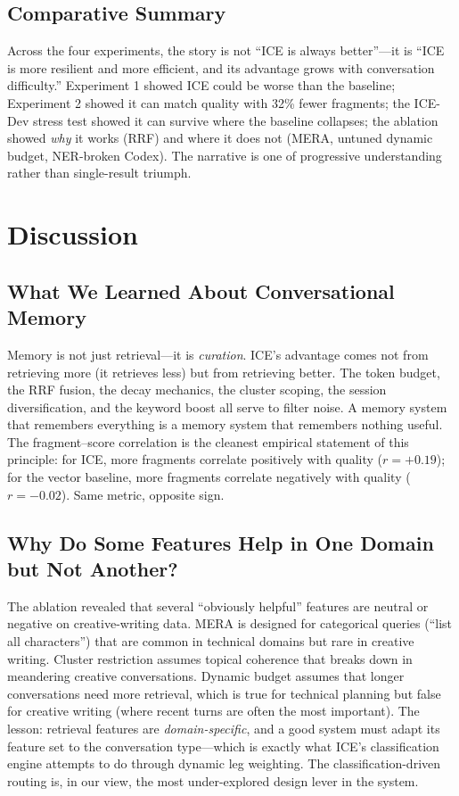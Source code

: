 \documentclass[11pt,a4paper]{article}
\begin{document}
\subsection{Comparative Summary}

Across the four experiments, the story is not ``ICE is always better''---it is ``ICE is more resilient and more efficient, and its advantage grows with conversation difficulty.'' Experiment 1 showed ICE could be worse than the baseline; Experiment 2 showed it can match quality with 32\% fewer fragments; the ICE-Dev stress test showed it can survive where the baseline collapses; the ablation showed \emph{why} it works (RRF) and where it does not (MERA, untuned dynamic budget, NER-broken Codex). The narrative is one of progressive understanding rather than single-result triumph.

\section{Discussion}
\label{sec:discussion}

\subsection{What We Learned About Conversational Memory}

Memory is not just retrieval---it is \emph{curation}. ICE's advantage comes not from retrieving more (it retrieves less) but from retrieving better. The token budget, the RRF fusion, the decay mechanics, the cluster scoping, the session diversification, and the keyword boost all serve to filter noise. A memory system that remembers everything is a memory system that remembers nothing useful. The fragment--score correlation is the cleanest empirical statement of this principle: for ICE, more fragments correlate positively with quality ($r = +0.19$); for the vector baseline, more fragments correlate negatively with quality ($r = -0.02$). Same metric, opposite sign.

\subsection{Why Do Some Features Help in One Domain but Not Another?}

The ablation revealed that several ``obviously helpful'' features are neutral or negative on creative-writing data. MERA is designed for categorical queries (``list all characters'') that are common in technical domains but rare in creative writing. Cluster restriction assumes topical coherence that breaks down in meandering creative conversations. Dynamic budget assumes that longer conversations need more retrieval, which is true for technical planning but false for creative writing (where recent turns are often the most important). The lesson: retrieval features are \emph{domain-specific}, and a good system must adapt its feature set to the conversation type---which is exactly what ICE's classification engine attempts to do through dynamic leg weighting. The classification-driven routing is, in our view, the most under-explored design lever in the system.
\end{document}
